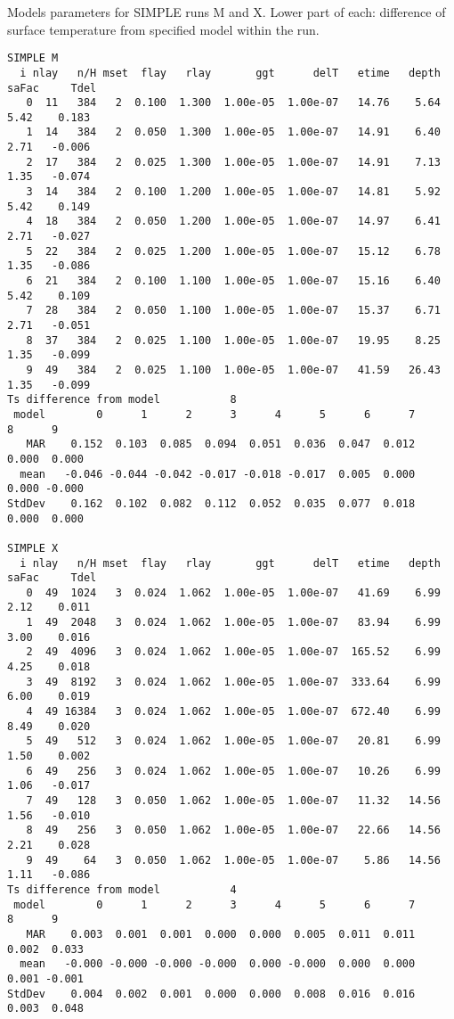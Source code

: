 \documentclass{article}
\begin{document}
\begin{table} \caption[KRCsimple runs M and X] {Models parameters for SIMPLE runs M and X. 
Lower part of each: difference of surface temperature from specified model within the run.}  \label{srunM}
\begin{verbatim}
SIMPLE M
  i nlay   n/H mset  flay   rlay       ggt      delT   etime   depth  saFac     Tdel
   0  11   384   2  0.100  1.300  1.00e-05  1.00e-07   14.76    5.64   5.42    0.183
   1  14   384   2  0.050  1.300  1.00e-05  1.00e-07   14.91    6.40   2.71   -0.006
   2  17   384   2  0.025  1.300  1.00e-05  1.00e-07   14.91    7.13   1.35   -0.074
   3  14   384   2  0.100  1.200  1.00e-05  1.00e-07   14.81    5.92   5.42    0.149
   4  18   384   2  0.050  1.200  1.00e-05  1.00e-07   14.97    6.41   2.71   -0.027
   5  22   384   2  0.025  1.200  1.00e-05  1.00e-07   15.12    6.78   1.35   -0.086
   6  21   384   2  0.100  1.100  1.00e-05  1.00e-07   15.16    6.40   5.42    0.109
   7  28   384   2  0.050  1.100  1.00e-05  1.00e-07   15.37    6.71   2.71   -0.051
   8  37   384   2  0.025  1.100  1.00e-05  1.00e-07   19.95    8.25   1.35   -0.099
   9  49   384   2  0.025  1.100  1.00e-05  1.00e-07   41.59   26.43   1.35   -0.099
Ts difference from model           8 
 model        0      1      2      3      4      5      6      7      8      9
   MAR    0.152  0.103  0.085  0.094  0.051  0.036  0.047  0.012  0.000  0.000
  mean   -0.046 -0.044 -0.042 -0.017 -0.018 -0.017  0.005  0.000  0.000 -0.000
StdDev    0.162  0.102  0.082  0.112  0.052  0.035  0.077  0.018  0.000  0.000

SIMPLE X
  i nlay   n/H mset  flay   rlay       ggt      delT   etime   depth  saFac     Tdel
   0  49  1024   3  0.024  1.062  1.00e-05  1.00e-07   41.69    6.99   2.12    0.011
   1  49  2048   3  0.024  1.062  1.00e-05  1.00e-07   83.94    6.99   3.00    0.016
   2  49  4096   3  0.024  1.062  1.00e-05  1.00e-07  165.52    6.99   4.25    0.018
   3  49  8192   3  0.024  1.062  1.00e-05  1.00e-07  333.64    6.99   6.00    0.019
   4  49 16384   3  0.024  1.062  1.00e-05  1.00e-07  672.40    6.99   8.49    0.020
   5  49   512   3  0.024  1.062  1.00e-05  1.00e-07   20.81    6.99   1.50    0.002
   6  49   256   3  0.024  1.062  1.00e-05  1.00e-07   10.26    6.99   1.06   -0.017
   7  49   128   3  0.050  1.062  1.00e-05  1.00e-07   11.32   14.56   1.56   -0.010
   8  49   256   3  0.050  1.062  1.00e-05  1.00e-07   22.66   14.56   2.21    0.028
   9  49    64   3  0.050  1.062  1.00e-05  1.00e-07    5.86   14.56   1.11   -0.086
Ts difference from model           4
 model        0      1      2      3      4      5      6      7      8      9
   MAR    0.003  0.001  0.001  0.000  0.000  0.005  0.011  0.011  0.002  0.033
  mean   -0.000 -0.000 -0.000 -0.000  0.000 -0.000  0.000  0.000  0.001 -0.001
StdDev    0.004  0.002  0.001  0.000  0.000  0.008  0.016  0.016  0.003  0.048
\end{verbatim}
\vspace{-3.0mm}
\hrulefill \end{table} 
\end{document}
